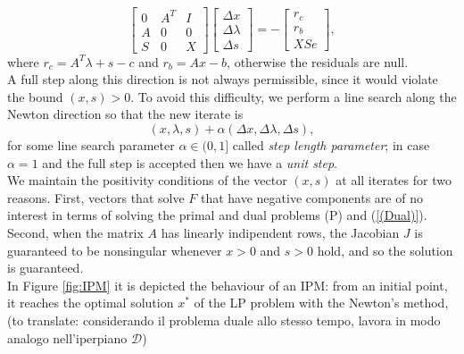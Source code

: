 \documentclass[a4paper,10 pt,titlepage,twoside]{book}
\theoremstyle{plain}
\theoremstyle{definition}
\theoremstyle{remark}
\begin{document}
\begin{equation}\label{(5.1)}
	\begin{bmatrix}
0&A^{T}&I \\A&0&0\\S&0&X
	\end{bmatrix}\begin{bmatrix}
	\Delta x\\\Delta\lambda \\\Delta s
	\end{bmatrix}=-\begin{bmatrix}
	r_{c}\\r_{b}\\XSe
	\end{bmatrix},
\end{equation}
where $r_{c}= A^{T}\lambda+s-c$ and $r_{b}= Ax-b$, otherwise the residuals are null.\\
A full step along this direction is not always permissible, since it would violate the bound $(x,s)>0$. To avoid this difficulty, we perform a line search along the Newton direction so that the new iterate is
\begin{equation*}
	(x,\lambda,s) +\alpha (\Delta x,\Delta \lambda,\Delta s),
\end{equation*} 
for some line search parameter $\alpha \in (0,1]$ called \textit{step length parameter}; in case $\alpha = 1$ and the full step is accepted then we have a \textit{unit step}.\\We maintain the positivity conditions of the vector $(x,s)$ at all iterates for two reasons. First, vectors that solve $\mathit{F}$ that have negative components are of no interest in terms of solving the primal and dual problems (P) and (\ref{(Dual)}). Second, when the matrix $A$ has linearly indipendent rows, the Jacobian $J$ is guaranteed to be nonsingular whenever $x>0$ and $s>0$ hold, and so the solution is guaranteed. %
\\
In Figure \ref{fig:IPM} it is depicted the behaviour of an IPM: from an initial point, it reaches the optimal solution $x^{*}$ of the LP problem \label{LPexample} with the Newton's method, (to translate: considerando il problema duale allo stesso tempo, lavora in modo analogo nell'iperpiano $\mathcal{D}$)
\end{document}

